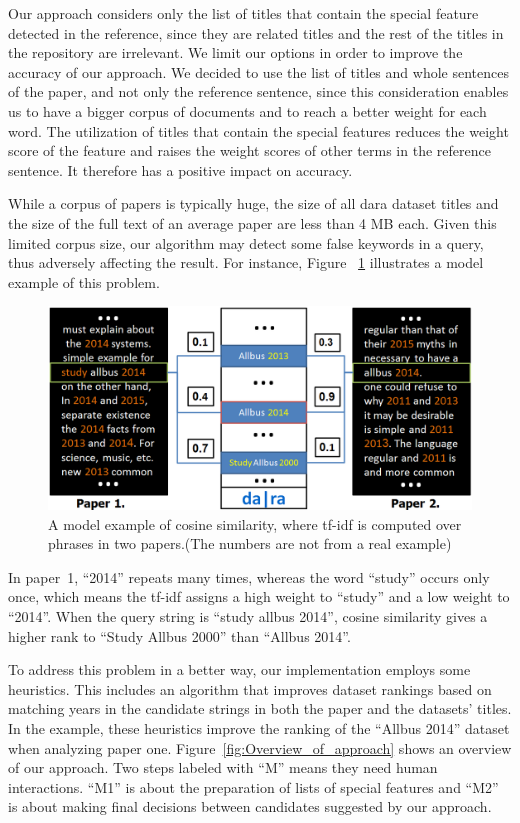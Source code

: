 \documentclass{IOS-Book-Article}
\newcommand{\dara}{\textsf{da\textbar ra}}
\begin{document}
Our approach considers only the list of titles that contain the special feature detected in the reference, since they are related titles and the rest of the titles in the repository are irrelevant. We limit our options in order to improve the accuracy of our approach. We decided to use the list of titles and whole sentences of the paper, and not only the reference sentence, since this consideration enables us to have a bigger corpus of documents and to reach a better weight for each word. The utilization of titles that contain the special features reduces the weight score of the feature and raises the weight scores of other terms in the reference sentence. It therefore has a positive impact on accuracy.

While a corpus of papers is typically huge, the size of all {\dara} dataset titles and the size of the full text of an average paper are less than 4 MB each. Given this limited corpus size, our algorithm may detect some false keywords in a query, thus adversely affecting the result. For instance, Figure ~\ref{fig:similarity-example} illustrates a model example of this problem.

\begin{figure}[h]
	\centering
	\includegraphics[width=4.5 in]{ToyExamplE.PNG} 
	\caption{A model example of cosine similarity, where tf-idf is computed over phrases in two papers.(The numbers are not from a real example)}
	\label{fig:similarity-example}
\end{figure}

In paper~1, \enquote{2014} repeats many times, whereas the word \enquote{study} occurs only once, which means the tf-idf assigns a high weight to \enquote{study} and a low weight to \enquote{2014}. When the query string is \enquote{study allbus 2014}, cosine similarity gives a higher rank to \enquote{Study Allbus 2000} than \enquote{Allbus 2014}.

To address this problem in a better way, our implementation employs some heuristics. This includes an algorithm that improves dataset rankings based on matching years in the candidate strings in both the paper and the datasets' titles. In the example, these heuristics improve the ranking of the \enquote{Allbus 2014} dataset when analyzing paper one. Figure~\ref{fig:Overview_of_approach} shows an overview of our approach. Two steps labeled with \enquote{M} means they need human interactions. \enquote{M1} is about the preparation of lists of special features and \enquote{M2} is about making final decisions between candidates suggested by our approach.
\end{document}

